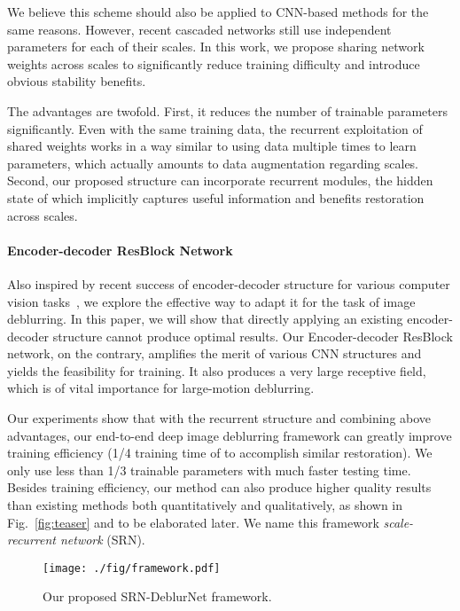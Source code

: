 \documentclass[10pt,twocolumn,letterpaper]{article}
\begin{document}
We believe this scheme should also be applied to CNN-based methods for the same reasons. However, recent cascaded networks \cite{chen2017photographic,nah2017deep} still use independent parameters for each of their scales. 
In this work, we propose sharing network weights across scales to significantly reduce training difficulty and introduce obvious stability benefits.

The advantages are twofold. First, it reduces the number of trainable parameters significantly. 
Even with the same training data, the recurrent exploitation of shared weights works in a way similar to using data multiple times to learn parameters, which actually amounts to data augmentation regarding scales. Second, our proposed structure can incorporate recurrent modules, the hidden state of which implicitly captures useful information and benefits restoration across scales.

\vspace{-0.1in}
\paragraph{Encoder-decoder ResBlock Network}
Also inspired by recent success of encoder-decoder structure for various computer vision tasks~\cite{liu2017video,su2017deep,tao2017spmc,xu2017deep}, we explore the effective way to adapt it for the task of image deblurring. In this paper, we will show that directly applying an existing encoder-decoder structure cannot produce optimal results. Our Encoder-decoder ResBlock network, on the contrary, amplifies the merit of various CNN structures and yields the feasibility for training. It also produces a very large receptive field, which is of vital importance for large-motion deblurring.

Our experiments show that with the recurrent structure and combining above advantages, our end-to-end deep image deblurring framework can greatly improve training efficiency (1/4 training time of \cite{nah2017deep} to accomplish similar restoration). We only use less than 1/3 trainable parameters with much faster testing time. Besides training efficiency, our method can also produce higher quality results than existing methods both quantitatively and qualitatively, as shown in Fig.~\ref{fig:teaser} and to be elaborated later. We name this framework {\it scale-recurrent network} (SRN).


\begin{figure*}[ht]
    \begin{center}
\texttt{[image: ./fig/framework.pdf]}
    \end{center}
    \vspace{-0.1in}
    \caption{Our proposed SRN-DeblurNet framework.}\label{fig:framework}
    \vspace{-0.2in}
\end{figure*}
\end{document}
